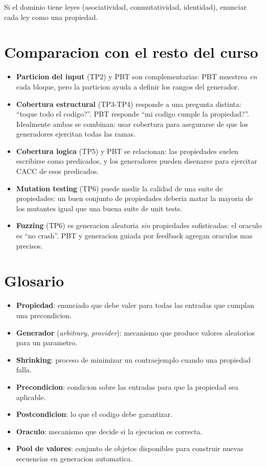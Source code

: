 \documentclass[12pt,a4paper]{article}
\begin{document}
Si el dominio tiene leyes (asociatividad, conmutatividad, identidad), enunciar cada ley como
una propiedad.

\section{Comparacion con el resto del curso}

\begin{itemize}
  \item \textbf{Particion del input} (TP2) y PBT son complementarias: PBT muestrea \emph{en}
  cada bloque, pero la particion ayuda a definir los rangos del generador.
  \item \textbf{Cobertura estructural} (TP3-TP4) responde a una pregunta distinta:
  ``\textquestiondown{}toque todo el codigo?''. PBT responde ``\textquestiondown{}mi codigo
  cumple la propiedad?''. Idealmente ambas se combinan: usar cobertura para asegurarse de que
  los generadores ejercitan todas las ramas.
  \item \textbf{Cobertura logica} (TP5) y PBT se relacionan: las propiedades suelen escribirse
  como predicados, y los generadores pueden disenarse para ejercitar CACC de esos predicados.
  \item \textbf{Mutation testing} (TP6) puede medir la calidad de una suite de propiedades:
  un buen conjunto de propiedades deberia matar la mayoria de los mutantes igual que una
  buena suite de unit tests.
  \item \textbf{Fuzzing} (TP6) es generacion aleatoria \emph{sin} propiedades sofisticadas:
  el oraculo es ``no crash''. PBT y generacion guiada por feedback agregan oraculos mas
  precisos.
\end{itemize}

\section{Glosario}

\begin{itemize}
  \item \textbf{Propiedad}: enunciado que debe valer para todas las entradas que cumplan una
  precondicion.
  \item \textbf{Generador} (\emph{arbitrary}, \emph{provider}): mecanismo que produce valores
  aleatorios para un parametro.
  \item \textbf{Shrinking}: proceso de minimizar un contraejemplo cuando una propiedad falla.
  \item \textbf{Precondicion}: condicion sobre las entradas para que la propiedad sea
  aplicable.
  \item \textbf{Postcondicion}: lo que el codigo debe garantizar.
  \item \textbf{Oraculo}: mecanismo que decide si la ejecucion es correcta.
  \item \textbf{Pool de valores}: conjunto de objetos disponibles para construir nuevas
  secuencias en generacion automatica.
\end{itemize}
\end{document}
